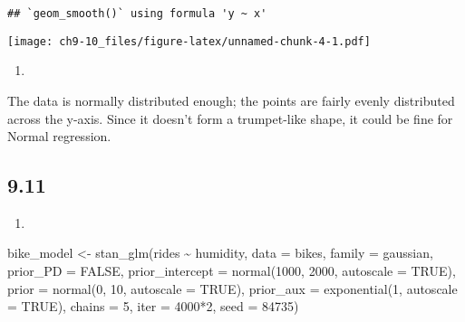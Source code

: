 \documentclass[
]{article}
\newenvironment{Shaded}{\begin{snugshade}}{\end{snugshade}}
\newcommand{\AttributeTok}[1]{\textcolor[rgb]{0.77,0.63,0.00}{#1}}
\newcommand{\ConstantTok}[1]{\textcolor[rgb]{0.00,0.00,0.00}{#1}}
\newcommand{\DecValTok}[1]{\textcolor[rgb]{0.00,0.00,0.81}{#1}}
\newcommand{\FunctionTok}[1]{\textcolor[rgb]{0.00,0.00,0.00}{#1}}
\newcommand{\NormalTok}[1]{#1}
\newcommand{\OtherTok}[1]{\textcolor[rgb]{0.56,0.35,0.01}{#1}}
\newcommand{\SpecialCharTok}[1]{\textcolor[rgb]{0.00,0.00,0.00}{#1}}
\providecommand{\tightlist}{%
  \setlength{\itemsep}{0pt}\setlength{\parskip}{0pt}}
\begin{document}
\begin{verbatim}
## `geom_smooth()` using formula 'y ~ x'
\end{verbatim}

\texttt{[image: ch9-10\_files/figure-latex/unnamed-chunk-4-1.pdf]}

\begin{enumerate}
\def\labelenumi{\alph{enumi}.}
\setcounter{enumi}{1}
\tightlist
\item
\end{enumerate}

The data is normally distributed enough; the points are fairly evenly
distributed across the y-axis. Since it doesn't form a trumpet-like
shape, it could be fine for Normal regression.

\hypertarget{section-2}{%
\subsection{9.11}\label{section-2}}

\begin{enumerate}
\def\labelenumi{\alph{enumi}.}
\tightlist
\item
\end{enumerate}

\begin{Shaded}
\begin{Highlighting}[]
\NormalTok{bike\_model }\OtherTok{\textless{}{-}} \FunctionTok{stan\_glm}\NormalTok{(rides }\SpecialCharTok{\textasciitilde{}}\NormalTok{ humidity, }\AttributeTok{data =}\NormalTok{ bikes, }
  \AttributeTok{family =}\NormalTok{ gaussian,}
  \AttributeTok{prior\_PD =} \ConstantTok{FALSE}\NormalTok{,}
  \AttributeTok{prior\_intercept =} \FunctionTok{normal}\NormalTok{(}\DecValTok{1000}\NormalTok{, }\DecValTok{2000}\NormalTok{, }\AttributeTok{autoscale =} \ConstantTok{TRUE}\NormalTok{),}
  \AttributeTok{prior =} \FunctionTok{normal}\NormalTok{(}\DecValTok{0}\NormalTok{, }\DecValTok{10}\NormalTok{, }\AttributeTok{autoscale =} \ConstantTok{TRUE}\NormalTok{), }
  \AttributeTok{prior\_aux =} \FunctionTok{exponential}\NormalTok{(}\DecValTok{1}\NormalTok{, }\AttributeTok{autoscale =} \ConstantTok{TRUE}\NormalTok{),}
  \AttributeTok{chains =} \DecValTok{5}\NormalTok{, }\AttributeTok{iter =} \DecValTok{4000}\SpecialCharTok{*}\DecValTok{2}\NormalTok{, }\AttributeTok{seed =} \DecValTok{84735}\NormalTok{)}
\end{Highlighting}
\end{Shaded}
\end{document}
